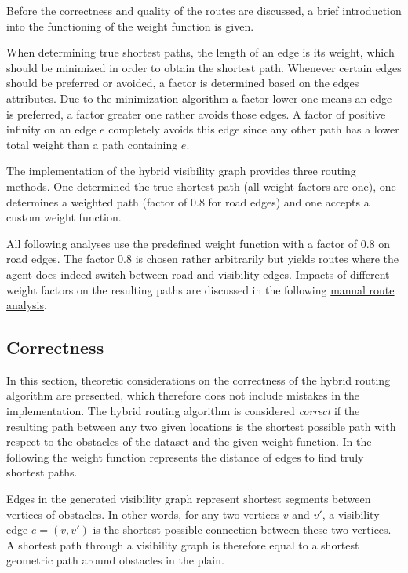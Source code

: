 		Before the correctness and quality of the routes are discussed, a brief introduction into the functioning of the weight function is given.
		
		When determining true shortest paths, the length of an edge is its weight, which should be minimized in order to obtain the shortest path.
		Whenever certain edges should be preferred or avoided, a factor is determined based on the edges attributes.
		Due to the minimization algorithm a factor lower one means an edge is preferred, a factor greater one rather avoids those edges.
		A factor of positive infinity on an edge $e$ completely avoids this edge since any other path has a lower total weight than a path containing $e$.
		
		The implementation of the hybrid visibility graph provides three routing methods.
		One determined the true shortest path (all weight factors are one), one determines a weighted path (factor of 0.8 for road edges) and one accepts a custom weight function.
		
		All following analyses use the predefined weight function with a factor of 0.8 on road edges.
		The factor 0.8 is chosen rather arbitrarily but yields routes where the agent does indeed switch between road and visibility edges.
		Impacts of different weight factors on the resulting paths are discussed in the following \hyperref[subsubsec:manual-route-analysis]{manual route analysis}.

	\subsection{Correctness}
	\label{subsec:correctness}
	
		In this section, theoretic considerations on the correctness of the hybrid routing algorithm are presented, which therefore does not include mistakes in the implementation.
		The hybrid routing algorithm is considered \emph{correct} if the resulting path between any two given locations is the shortest possible path with respect to the obstacles of the dataset and the given weight function.
		In the following the weight function represents the distance of edges to find truly shortest paths.
		
		Edges in the generated visibility graph represent shortest segments between vertices of obstacles.
		In other words, for any two vertices $v$ and $v'$, a visibility edge $e=(v, v')$ is the shortest possible connection between these two vertices.
		A shortest path through a visibility graph is therefore equal to a shortest geometric path around obstacles in the plain.
		
